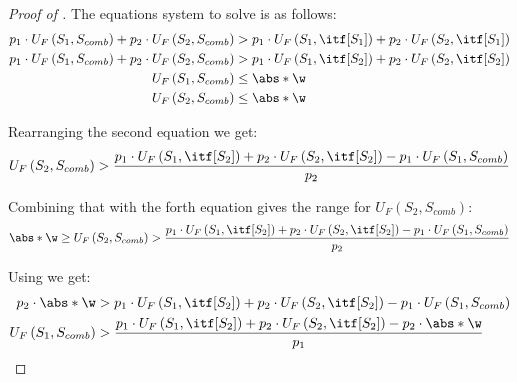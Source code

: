 \begin{proof}[Proof of ]
The equations system to solve is as follows:
\begin{equation*}
    \begin{aligned}
        p_1 \cdot U_F\left(S_1,S_{comb}\right)+p_2 \cdot U_F\left(S_2,S_{comb}\right) &> p_1 \cdot U_F\left(S_1,\itf[S_1]\right) + p_2 \cdot U_F\left(S_2,\itf[S_1]\right) \\
        p_1 \cdot U_F\left(S_1,S_{comb}\right)+p_2 \cdot U_F\left(S_2,S_{comb}\right) &> p_1 \cdot U_F\left(S_1,\itf[S_2]\right) + p_2 \cdot U_F\left(S_2,\itf[S_2]\right) \\
        U_F\left(S_1,S_{comb}\right) &\leq \abs*{\w} \\ 
        U_F\left(S_2,S_{comb}\right) &\leq \abs*{\w}
    \end{aligned}
\end{equation*}

Rearranging the second equation we get: 
\begin{equation*}
    U_F\left(S_2,S_{comb}\right) > \frac{p_1 \cdot U_F\left(S_1,\itf[S_2]\right) + p_2 \cdot U_F\left(S_2,\itf[S_2]\right) - p_1 \cdot U_F\left(S_1,S_{comb}\right)}{p_2}
\end{equation*}

Combining that with the forth equation gives the range for $U_F\left(S_2,S_{comb}\right)$:
\begin{equation} \label{equations: Second condition for two strategies}
    \abs*{\w} \geq U_F\left(S_2,S_{comb}\right) > \frac{p_1 \cdot U_F\left(S_1,\itf[S_2]\right) + p_2 \cdot U_F\left(S_2,\itf[S_2]\right) - p_1 \cdot U_F\left(S_1,S_{comb}\right)}{p_2}
\end{equation}

Using  we get:
\begin{equation*}
    \begin{aligned}
    p_2\cdot \abs*{\w} &> p_1 \cdot U_F\left(S_1,\itf[S_2]\right) + p_2 \cdot U_F\left(S_2,\itf[S_2]\right) - p_1 \cdot U_F\left(S_1,S_{comb}\right) \\
    U_F\left(S_1,S_{comb}\right) &> \frac{p_1 \cdot U_F\left(S_1,\itf[S_2]\right) + p_2 \cdot U_F\left(S_2,\itf[S_2]\right) - p_2\cdot \abs*{\w}}{p_1}
    \end{aligned}
\end{equation*}


\end{proof}
